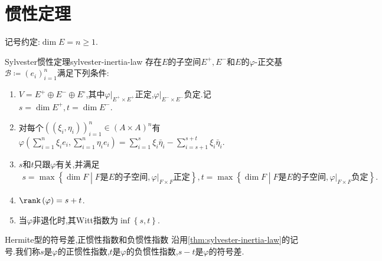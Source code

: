 \section{惯性定理}

记号约定:$\dim E=n\geq 1$.

\begin{theorem}{Sylvester惯性定理}{sylvester-inertia-law}
	存在$E$的子空间$E^{+},E^{-}$和$E$的$\varphi$-正交基$\mathcal{B}\coloneq\left(e_{i}\right)_{i=1}^{n}$满足下列条件:
	\begin{enumerate}
		\item $V=E^{+}\oplus E^{-}\oplus E^{\circ}$,其中$\varphi|_{E^{+}\times E^{+}}$正定,$\varphi|_{E^{-}\times E^{-}}$负定.记$s=\dim E^{+},t=\dim E^{-}$.
		\item 对每个$\left(\left(\xi_{i},\eta_{i}\right)\right)_{i=1}^{n}\in\left(A\times A\right)^{n}$有$\varphi\left(\sum\limits_{i=1}^{n}\xi_{i}e_{i},\sum\limits_{i=1}^{n}\eta_{i}e_{i}\right)=\sum\limits_{i=1}^{s}\xi_{i}\bar{\eta}_{i}-\sum\limits_{i=s+1}^{s+t}\xi_{i}\bar{\eta}_{i}$.
		\item $s$和$t$只跟$\varphi$有关,并满足
		\begin{align*}
			s=\max\left\{\dim F\middle|F\text{是}E\text{的子空间},\varphi|_{F\times F}\text{正定}\right\},t=\max\left\{\dim F\middle|F\text{是}E\text{的子空间},\varphi|_{F\times F}\text{负定}\right\}.
		\end{align*}
		\item $\rank\left(\varphi\right)=s+t$.
		\item 当$\varphi$非退化时,其Witt指数为$\inf\left\{s,t\right\}$.
	\end{enumerate}
\end{theorem}

\begin{definition}{Hermite型的符号差,正惯性指数和负惯性指数}{}
	沿用\ref{thm:sylvester-inertia-law}的记号.我们称$s$是$\varphi$的正惯性指数,$t$是$\varphi$的负惯性指数,$s-t$是$\varphi$的符号差.
\end{definition}